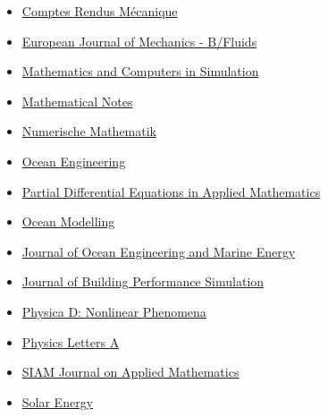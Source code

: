 \documentclass[final, a4paper, oneside, 12pt]{article}
\numberwithin{equation}{section}
\begin{document}
\begin{itemize}
    \item \href{http://www.sciencedirect.com/science/journal/16310721}%
    {Comptes Rendus M\'ecanique}
    
    \item  \href{http://www.elsevier.com/wps/find/journaldescription.cws_home/600738/description}%
    {European Journal of Mechanics - B/Fluids}
    
    \item \href{http://www.elsevier.com/wps/find/journaldescription.cws_home/505615/description#description}%
    {Mathematics and Computers in Simulation}

    \item \href{https://link.springer.com/journal/11006/}{Mathematical Notes}
    
    \item \href{http://www.springerlink.com/content/100497/}%
    {Numerische Mathematik}
    
    \item \href{http://www.journals.elsevier.com/ocean-engineering/}%
    {Ocean Engineering}

    \item \href{https://www.sciencedirect.com/journal/partial-differential-equations-in-applied-mathematics/}{Partial Differential Equations in Applied Mathematics}
    
    \item \href{http://www.elsevier.com/wps/find/journaldescription.cws_home/601376/description#description}%
    {Ocean Modelling}
    
    \item \href{http://www.springer.com/engineering/civil+engineering/journal/40722/}{Journal of Ocean Engineering and Marine Energy}
    
    \item \href{https://www.tandfonline.com/toc/tbps20/current/}{Journal of Building Performance Simulation}

    \item \href{https://www.sciencedirect.com/journal/physica-d-nonlinear-phenomena/}{Physica D: Nonlinear Phenomena}
    
    \item \href{http://www.journals.elsevier.com/physics-letters-a/}{Physics Letters A}
    
    \item \href{http://www.siam.org/journals/siap.php}{SIAM Journal on Applied Mathematics}

    \item \href{https://www.sciencedirect.com/journal/solar-energy/}{Solar Energy}
  

\end{itemize}
\end{document}
